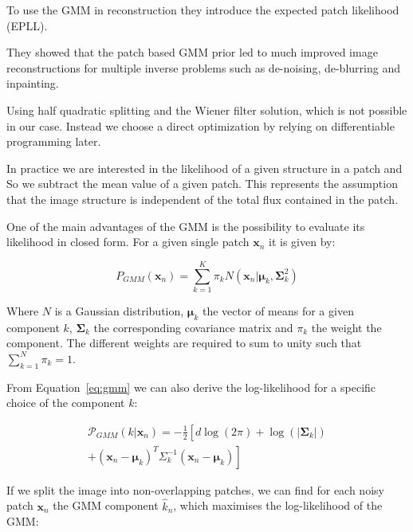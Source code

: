 \documentclass[twocolumn]{aastex631}
\begin{document}
    To use the GMM in reconstruction they introduce the expected patch likelihood (EPLL). 
    
    They showed that the patch based GMM prior led to much improved image reconstructions for multiple inverse problems such as de-noising, de-blurring and inpainting.

    Using half quadratic splitting and the Wiener filter solution, which is not possible
    in our case. Instead we choose a direct optimization by relying on differentiable
    programming later. 
    
    In practice we are interested in the likelihood of a given structure in a patch and
    So we subtract the mean value of a given patch. This represents the assumption that
    the image structure is independent of the total flux contained in the patch.
    
    One of the main advantages of the GMM is the possibility to evaluate its likelihood
    in closed form. For a given single patch $\mathbf{x}_n$ it is given by:

    \begin{equation}
        \label{eq:gmm}
        P_{GMM}(\mathbf{x}_n) = \sum_{k=1}^K \pi_k N(\mathbf{x}_n| \boldsymbol{\mu}_k, \boldsymbol{\Sigma}_k^2)
    \end{equation}

    Where $N$ is a Gaussian distribution, $\boldsymbol{\mu}_k$ the vector of means for
    a given component $k$, $\boldsymbol{\Sigma}_k$ the corresponding covariance matrix
    and $\pi_k$ the weight the component. The different weights are required to sum to unity such that $\sum_{k=1}^N\pi_k = 1$. 

    From Equation~\ref{eq:gmm} we can also derive the log-likelihood for a specific choice of the component $k$:
        
    \begin{equation}
    \begin{split}
    \mathcal{P}_{GMM}(k| \mathbf{x}_n) = -\frac{1}{2} \left[ \right. d \log(2\pi)
    + \log(|\boldsymbol \Sigma_{k}|)\\
    + (\mathbf{x}_n - \boldsymbol{\mu}_{k})^T \Sigma^{-1}_{k}(\mathbf{x}_n - \boldsymbol{\mu}_{k}) \left. \right]
    \end{split}
    \end{equation}

    If we split the image into non-overlapping patches, we can find for each noisy patch $\mathbf{x}_n$ the GMM component $\hat{k}_n$, which maximises the log-likelihood of the GMM:
        
\end{document}
